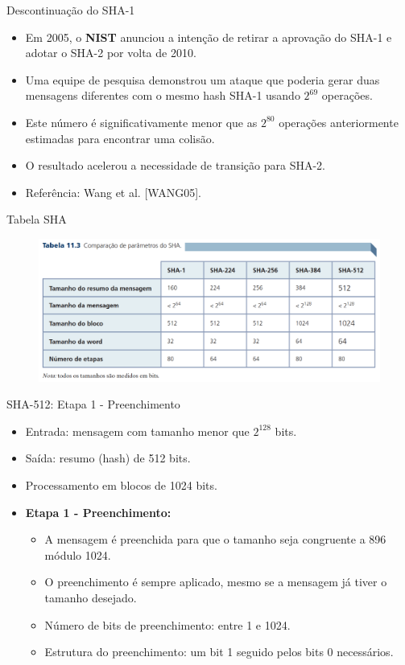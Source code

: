 \begin{frame}{Descontinuação do SHA-1}
    \begin{itemize}
        \item Em 2005, o \textbf{NIST} anunciou a intenção de retirar a aprovação do SHA-1 e adotar o SHA-2 por volta de 2010.
        \item Uma equipe de pesquisa demonstrou um ataque que poderia gerar duas mensagens diferentes com o mesmo hash SHA-1 usando $2^{69}$ operações.
        \item Este número é significativamente menor que as $2^{80}$ operações anteriormente estimadas para encontrar uma colisão.
        \item O resultado acelerou a necessidade de transição para SHA-2.
        \item Referência: Wang et al. [WANG05].
    \end{itemize}
\end{frame}

\begin{frame}{Tabela SHA}
    \begin{figure}
        \centering
        \includegraphics[width=\linewidth]{Figuras/tabela-sha.png}

    \end{figure}

\end{frame}

\begin{frame}{SHA-512: Etapa 1 -  Preenchimento}
    \begin{itemize}
        \item Entrada: mensagem com tamanho menor que $2^{128}$ bits.
        \item Saída: resumo (hash) de 512 bits.
        \item Processamento em blocos de 1024 bits.
        \item \textbf{Etapa 1 - Preenchimento:}
              \begin{itemize}
                  \item A mensagem é preenchida para que o tamanho seja congruente a 896 módulo 1024.
                  \item O preenchimento é sempre aplicado, mesmo se a mensagem já tiver o tamanho desejado.
                  \item Número de bits de preenchimento: entre 1 e 1024.
                  \item Estrutura do preenchimento: um bit 1 seguido pelos bits 0 necessários.
              \end{itemize}
    \end{itemize}
\end{frame}

